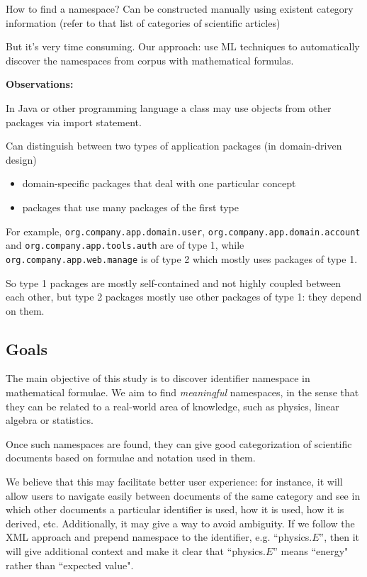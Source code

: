 How to find a namespace? Can be constructed manually using existent category information
(refer to that list of categories of scientific articles)

But it's very time consuming. Our approach: use ML techniques to automatically discover
the namespaces from corpus with mathematical formulas.


\textbf{Observations:}


In Java or other programming language a class may use objects from other packages
via import statement.

Can distinguish between two types of application packages (in domain-driven design)

\begin{itemize}
  \item domain-specific packages that deal with one particular concept
  \item packages that use many packages of the first type
\end{itemize}

For example, \verb|org.company.app.domain.user|, \verb|org.company.app.domain.account|
and \verb|org.company.app.tools.auth| are of type 1, while
\verb|org.company.app.web.manage| is of type 2 which mostly uses packages of type 1.

So type 1 packages are mostly self-contained and not highly coupled between each other,
but type 2 packages mostly use other packages of type 1: they depend on them.



\subsection{Goals}

The main objective of this study is to discover identifier namespace in mathematical formulae.
We aim to find \emph{meaningful} namespaces, in the sense that they can be related to a real-world area of knowledge, such as physics, linear algebra or statistics.

Once such namespaces are found, they can give good categorization of scientific documents based on formulae and notation used in them.

We believe that this may facilitate better user experience: for instance, it will allow users to navigate easily between documents of the same category and see in which other documents a particular identifier is used, how it is used, how it is derived, etc. Additionally, it may give a way to avoid ambiguity. If we follow the XML approach \cite{xmlnamespaces} and prepend namespace to the identifier, e.g. ``physics.$E$'', then it will give additional context and make it clear that ``physics.$E$'' means ``energy" rather than ``expected value".

